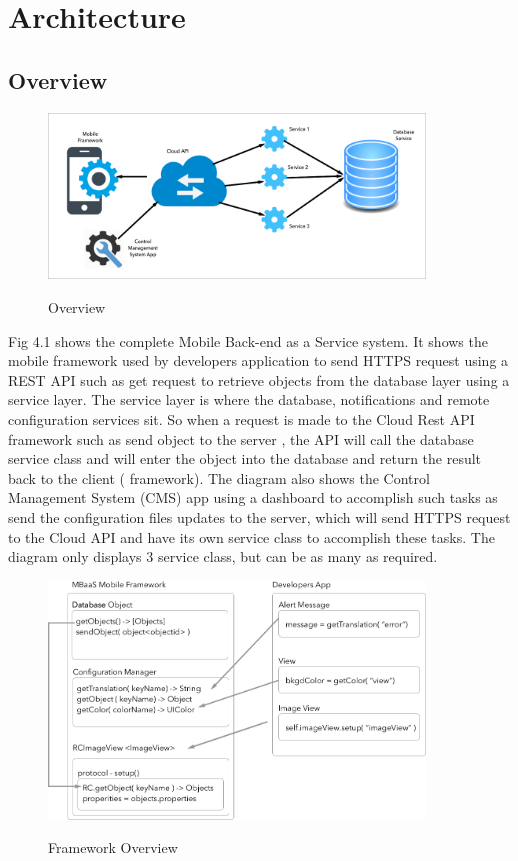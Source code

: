 \chapter{Architecture}

\section{Overview}

\begin{figure}[h]
    \caption{Overview}
    \centering
    \includegraphics[width=100mm]{images/overview}
    \label{fig:label}
\end{figure}

Fig 4.1 shows the complete Mobile Back-end as a Service system. It shows the mobile framework used by developers application to send HTTPS request using a REST API such as get request to retrieve objects from the database layer using a service layer. The service layer is where the database, notifications
and remote configuration services sit. So when a request is made to the Cloud Rest API framework such as send object to the server , the API will call the database service class and will enter the object into the database and return the result back to the client ( framework). The diagram also shows the Control Management System (CMS) app using a dashboard to accomplish such tasks as send the configuration files updates to the server, which will send HTTPS request to the Cloud API and have its own service class to accomplish these tasks. The diagram only displays 3 service class, but can be as many as required.

\begin{figure}[h]
    \caption{Framework Overview}
    \centering
    \includegraphics[width=100mm]{images/framwork_architecture}
    \label{fig:label}
\end{figure}

